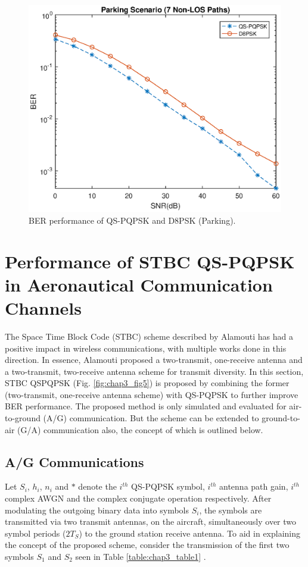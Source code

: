 \begin{figure} []
\centering
\includegraphics [width=0.5\columnwidth]{chap3_fig/chap3_fig4.eps} 
\caption{BER performance of QS-PQPSK and D8PSK (Parking).}
\label{fig:chap3_fig4}
\end{figure}



\section{Performance of STBC QS-PQPSK in Aeronautical Communication Channels}

The Space Time Block Code (STBC) scheme described by Alamouti \cite{alamouti1998simple} has had a positive impact in wireless communications, with multiple works done in this direction. In essence, Alamouti proposed a two-transmit, one-receive antenna and a two-transmit, two-receive antenna scheme for transmit diversity. In this section, STBC QSPQPSK (Fig. \ref{fig:chap3_fig5}) is proposed by combining the former (two-transmit, one-receive antenna scheme) with QS-PQPSK to further improve BER performance. The proposed method is only simulated and evaluated for air-to-ground (A/G) communication. But the scheme can be extended to ground-to-air (G/A) communication also, the concept of which is outlined below.

\subsection{A/G Communications}
Let $S_i$, $h_i$, $n_i$ and $\ast$ denote the $i^{th}$ QS-PQPSK symbol, $i^{th}$ antenna path gain, $i^{th}$ complex AWGN and the complex conjugate operation respectively. After modulating the outgoing binary data into symbols $S_i$, the symbols are transmitted via two transmit antennas, on the aircraft, simultaneously over two symbol periods ($2T_S$) to the ground station receive antenna. To aid in explaining the concept of the proposed scheme, consider the transmission of the first two symbols $S_1$ and $S_2$ seen in Table \ref{table:chap3_table1} \cite{alamouti1998simple}.

